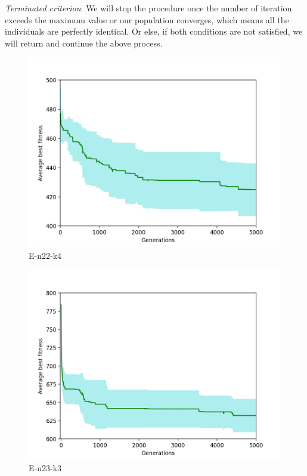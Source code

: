 \documentclass[conference,compsoc]{IEEEtran}
\begin{document}
\textit{Terminated criterion}: We will stop the procedure once the number of iteration exceeds the maximum value or our population converges, which means all the individuals are perfectly identical. Or else, if both conditions are not satisfied, we will return and continue the above process.\\
\newpage
\newpage

\begin{figure}[h!]
    \centering
    \includegraphics[scale=0.35]{E-n22-k4}
    \caption{E-n22-k4}
    \label{fig:my_label}
\end{figure}

\begin{figure}[h!]
    \centering
    \includegraphics[scale=0.35]{E-n23-k3}
    \caption{E-n23-k3}
    \label{fig:my_label}
\end{figure}
\end{document}
